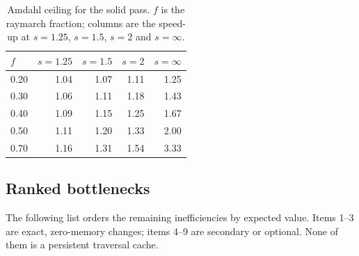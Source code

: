 \documentclass[11pt,a4paper]{article}
\theoremstyle{plain}
\theoremstyle{definition}
\theoremstyle{remark}
\begin{document}
\begin{table}[t]
\centering
\small
\caption{Amdahl ceiling for the solid pass. $f$ is the raymarch fraction;
columns are the speed-up at $s=1.25$, $s=1.5$, $s=2$ and $s=\infty$.}
\label{tab:amdahl}
\begin{tabular}{@{}lrrrr@{}}
\toprule
$f$ & $s=1.25$ & $s=1.5$ & $s=2$ & $s=\infty$ \\
\midrule
0.20 & 1.04 & 1.07 & 1.11 & 1.25 \\
0.30 & 1.06 & 1.11 & 1.18 & 1.43 \\
0.40 & 1.09 & 1.15 & 1.25 & 1.67 \\
0.50 & 1.11 & 1.20 & 1.33 & 2.00 \\
0.70 & 1.16 & 1.31 & 1.54 & 3.33 \\
\bottomrule
\end{tabular}
\end{table}

\subsection{Ranked bottlenecks}

The following list orders the remaining inefficiencies by expected value. Items
1--3 are exact, zero-memory changes; items 4--9 are secondary or optional.
None of them is a persistent traversal cache.
\end{document}
